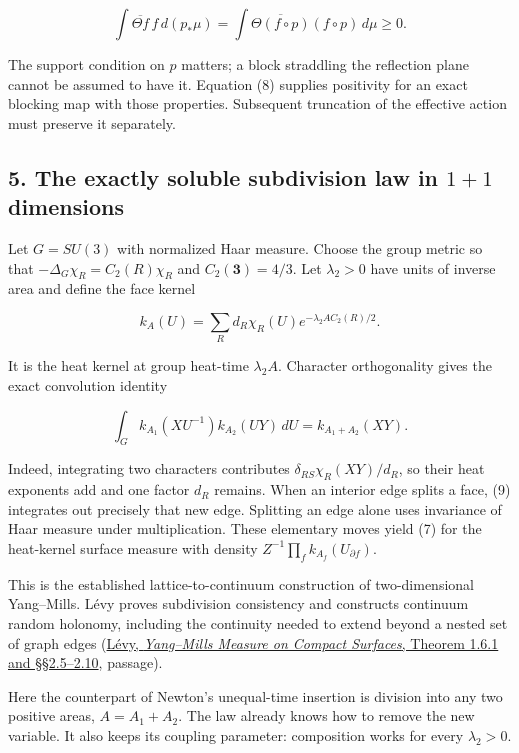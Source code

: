 \documentclass[11pt,a4paper]{article}
\begin{document}
\[\int\overline{\Theta f}\,f\,d(p_*\mu)
=\int\overline{\Theta(f\circ p)}(f\circ p)\,d\mu\ge0. \tag{8}\]

The support condition on \(p\) matters; a block straddling the
reflection plane cannot be assumed to have it. Equation (8) supplies
positivity for an exact blocking map with those properties. Subsequent
truncation of the effective action must preserve it separately.

\hypertarget{the-exactly-soluble-subdivision-law-in-11-dimensions}{%
\subsection{\texorpdfstring{5. The exactly soluble subdivision law in
\(1+1\)
dimensions}{5. The exactly soluble subdivision law in 1+1 dimensions}}\label{the-exactly-soluble-subdivision-law-in-11-dimensions}}

Let \(G=SU(3)\) with normalized Haar measure. Choose the group metric so
that \(-\Delta_G\chi_R=C_2(R)\chi_R\) and \(C_2(\mathbf3)=4/3\). Let
\(\lambda_2>0\) have units of inverse area and define the face kernel

\[k_A(U)=\sum_R d_R\chi_R(U)e^{-\lambda_2 A C_2(R)/2}.\]

It is the heat kernel at group heat-time \(\lambda_2A\). Character
orthogonality gives the exact convolution identity

\[\int_G k_{A_1}(XU^{-1})k_{A_2}(UY)\,dU
=k_{A_1+A_2}(XY). \tag{9}\]

Indeed, integrating two characters contributes
\(\delta_{RS}\chi_R(XY)/d_R\), so their heat exponents add and one
factor \(d_R\) remains. When an interior edge splits a face, (9)
integrates out precisely that new edge. Splitting an edge alone uses
invariance of Haar measure under multiplication. These elementary moves
yield (7) for the heat-kernel surface measure with density
\(Z^{-1}\prod_f k_{A_f}(U_{\partial f})\).

This is the established lattice-to-continuum construction of
two-dimensional Yang--Mills. Lévy proves subdivision consistency and
constructs continuum random holonomy, including the continuity needed to
extend beyond a nested set of graph edges
(\href{https://arxiv.org/pdf/math/0101239}{Lévy, \emph{Yang--Mills
Measure on Compact Surfaces}, Theorem 1.6.1 and §§2.5--2.10}, passage).

Here the counterpart of Newton's unequal-time insertion is division into
any two positive areas, \(A=A_1+A_2\). The law already knows how to
remove the new variable. It also keeps its coupling parameter:
composition works for every \(\lambda_2>0\).
\end{document}
